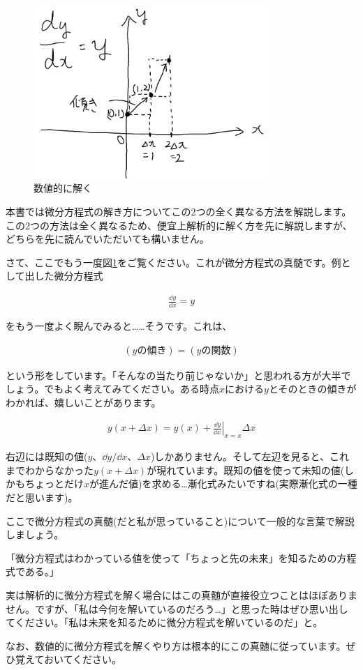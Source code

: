 \begin{figure}[ht!]
  \centering
  \includegraphics[width=9cm]{img/1-numerical.png}
  \caption{数値的に解く}
  \label{fig:1-numerical}
\end{figure}

本書では微分方程式の解き方についてこの2つの全く異なる方法を解説します。この2つの方法は全く異なるため、便宜上解析的に解く方を先に解説しますが、どちらを先に読んでいただいても構いません。

さて、ここでもう一度図\ref{fig:1-numerical}をご覧ください。これが微分方程式の真髄です。例として出した微分方程式

\begin{eqnarray}
    \frac{\dd y}{\dd x}=y
\end{eqnarray}

\noindent
をもう一度よく睨んでみると……そうです。これは、

\begin{eqnarray}
    (yの傾き)=(yの関数)
\end{eqnarray}

\noindent
という形をしています。「そんなの当たり前じゃないか」と思われる方が大半でしょう。でもよく考えてみてください。ある時点$x$における$y$とそのときの傾きがわかれば、嬉しいことがあります。

\begin{eqnarray}
    y(x+\Delta x)=y(x)+\left.\frac{\dd y}{\dd x}\right|_{x=x}\Delta x
\end{eqnarray}

右辺には既知の値($y$、$\dd y/\dd x$、$\Delta x$)しかありません。そして左辺を見ると、これまでわからなかった$y(x+\Delta x)$が現れています。既知の値を使って未知の値(しかもちょっとだけ$x$が進んだ値)を求める…漸化式みたいですね(実際漸化式の一種だと思います)。

ここで微分方程式の真髄(だと私が思っていること)について一般的な言葉で解説しましょう。

\begin{center}
    「微分方程式はわかっている値を使って「ちょっと先の未来」を知るための方程式である。」
\end{center}

実は解析的に微分方程式を解く場合にはこの真髄が直接役立つことはほぼありません。ですが、「私は今何を解いているのだろう…」と思った時はぜひ思い出してください。「私は未来を知るために微分方程式を解いているのだ」と。

なお、数値的に微分方程式を解くやり方は根本的にこの真髄に従っています。ぜひ覚えておいてください。



\clearpage